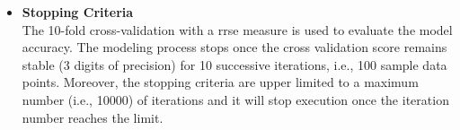 \begin{itemize}

\item \textbf{Stopping Criteria} \\
The 10-fold cross-validation with a \gls{rrse} measure is used to evaluate the model accuracy. The modeling process stops once the cross validation score remains stable (3 digits of precision) for 10 successive iterations, i.e., 100 sample data points. Moreover, the stopping criteria are upper limited to a maximum number (i.e., 10000) of iterations and it will stop execution once the iteration number reaches the limit.



\end{itemize}











